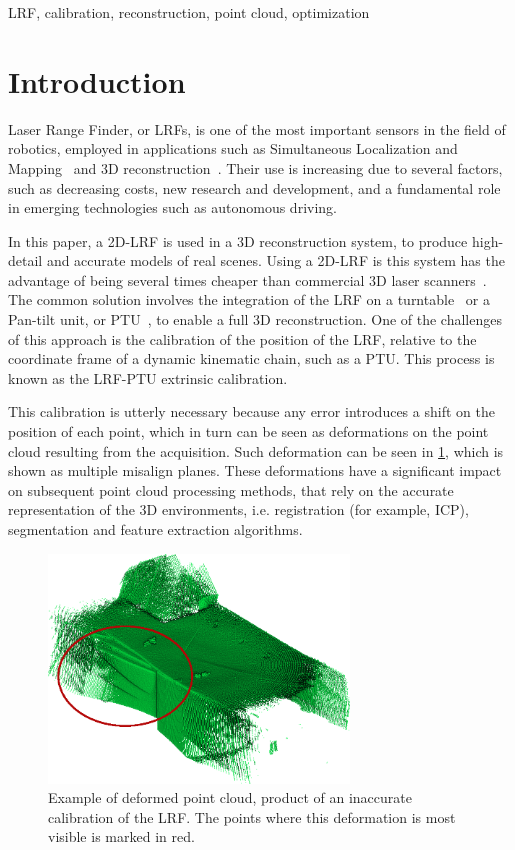 \documentclass[conference]{IEEEtran}
\begin{document}
\begin{IEEEkeywords}
LRF, calibration, reconstruction, point cloud, optimization
\end{IEEEkeywords}

\section{Introduction}\label{section:introduction}

Laser Range Finder, or LRFs, is one of the most important sensors in the field of robotics, employed in applications such as Simultaneous Localization and Mapping~\cite{cadena16} and 3D reconstruction~\cite{saito10}. Their use is increasing due to several factors, such as decreasing costs, new research and development, and a fundamental role in emerging technologies such as autonomous driving.

In this paper, a 2D-LRF is used in a 3D reconstruction system, to produce high-detail and accurate models of real scenes. Using a 2D-LRF is this system has the advantage of being several times cheaper than commercial 3D laser scanners~\cite{dias06}. The common solution involves the integration of the LRF on a turntable~\cite{maurelli09} or a Pan-tilt unit, or PTU~\cite{klimentjew09}, to enable a full 3D reconstruction. One of the challenges of this approach is the calibration of the position of the LRF, relative to the coordinate frame of a dynamic kinematic chain, such as a PTU. This process is known as the LRF-PTU extrinsic calibration.

This calibration is utterly necessary because any error introduces a shift on the position of each point, which in turn can be seen as deformations on the point cloud resulting from the acquisition. Such deformation can be seen in \cref{fig:deformed-pointcloud}, which is shown as multiple misalign planes. These deformations have a significant impact on subsequent point cloud processing methods, that rely on the accurate representation of the 3D environments, i.e. registration (for example, ICP), segmentation and feature extraction algorithms. 

\begin{figure}[h]
    \centering
    \includegraphics[width=8cm]{images/bad-pointcloud.png}
    \caption{Example of deformed point cloud, product of an inaccurate calibration of the LRF. The points where this deformation is most visible is marked in red.}
    \label{fig:deformed-pointcloud}
\end{figure}
\end{document}
